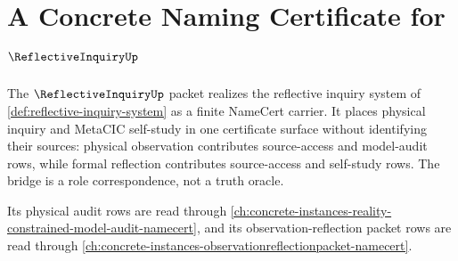 \chapter{A Concrete Naming Certificate for $\ReflectiveInquiryUp$}
\label{ch:concrete-instances-reflective-inquiry-namecert}

The $\ReflectiveInquiryUp$ packet realizes the reflective inquiry system of \autoref{def:reflective-inquiry-system} as a finite NameCert carrier. It places physical inquiry and MetaCIC self-study in one certificate surface without identifying their sources: physical observation contributes source-access and model-audit rows, while formal reflection contributes source-access and self-study rows. The bridge is a role correspondence, not a truth oracle.

Its physical audit rows are read through \autoref{ch:concrete-instances-reality-constrained-model-audit-namecert}, and its observation-reflection packet rows are read through \autoref{ch:concrete-instances-observationreflectionpacket-namecert}.

